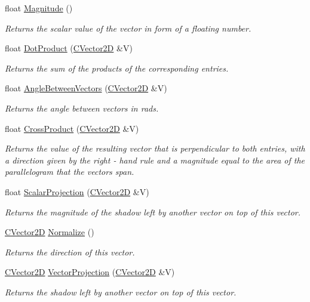 \begin{DoxyCompactItemize}
\item 
float \hyperlink{struct_c_vector2_d_a73cfa3e9fa169f7adc1c745c27cc7040}{Magnitude} ()
\begin{DoxyCompactList}\small\item\em Returns the scalar value of the vector in form of a floating number. \end{DoxyCompactList}\item 
float \hyperlink{struct_c_vector2_d_a9ab64b6d8c97ebaa257ca88298bd3899}{Dot\+Product} (\hyperlink{struct_c_vector2_d}{C\+Vector2D} \&V)
\begin{DoxyCompactList}\small\item\em Returns the sum of the products of the corresponding entries. \end{DoxyCompactList}\item 
float \hyperlink{struct_c_vector2_d_acfd07b9374cd9b738937613af11065d7}{Angle\+Between\+Vectors} (\hyperlink{struct_c_vector2_d}{C\+Vector2D} \&V)
\begin{DoxyCompactList}\small\item\em Returns the angle between vectors in rads. \end{DoxyCompactList}\item 
float \hyperlink{struct_c_vector2_d_a2b04b4827b7fc12bcc882533d93da279}{Cross\+Product} (\hyperlink{struct_c_vector2_d}{C\+Vector2D} \&V)
\begin{DoxyCompactList}\small\item\em Returns the value of the resulting vector that is perpendicular to both entries, with a direction given by the right -\/ hand rule and a magnitude equal to the area of the parallelogram that the vectors span. \end{DoxyCompactList}\item 
float \hyperlink{struct_c_vector2_d_ac6c97d3e6052916ccd6faee4d485bde3}{Scalar\+Projection} (\hyperlink{struct_c_vector2_d}{C\+Vector2D} \&V)
\begin{DoxyCompactList}\small\item\em Returns the magnitude of the shadow left by another vector on top of this vector. \end{DoxyCompactList}\item 
\hyperlink{struct_c_vector2_d}{C\+Vector2D} \hyperlink{struct_c_vector2_d_ab469c531b842962804e2385cba4d8632}{Normalize} ()
\begin{DoxyCompactList}\small\item\em Returns the direction of this vector. \end{DoxyCompactList}\item 
\hyperlink{struct_c_vector2_d}{C\+Vector2D} \hyperlink{struct_c_vector2_d_a0a34e892e36da1f65d0b9034d9691403}{Vector\+Projection} (\hyperlink{struct_c_vector2_d}{C\+Vector2D} \&V)
\begin{DoxyCompactList}\small\item\em Returns the shadow left by another vector on top of this vector. \end{DoxyCompactList}\end{DoxyCompactItemize}
